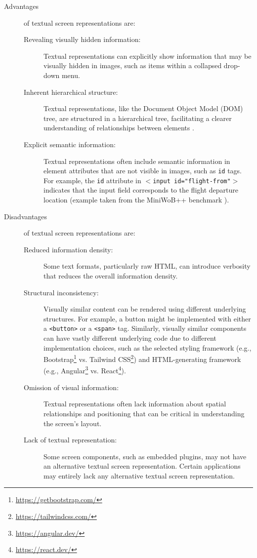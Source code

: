 %
\begin{description}
    \item[Advantages] of textual screen representations are: \hfill
    \begin{description}
        \item[Revealing visually hidden information:] 
            Textual representations can explicitly show information that may be visually hidden in images, such as items within a collapsed drop-down menu.
        \item[Inherent hierarchical structure:] 
            Textual representations, like the Document Object Model (DOM) tree, are structured in a hierarchical tree, facilitating a clearer understanding of relationships between elements .
        \item[Explicit semantic information:] 
            Textual representations often include semantic information in element attributes that are not visible in images, such as \texttt{id} tags. For example, the \texttt{id} attribute in \texttt{\(<\)input id="flight-from"\(>\)} indicates that the input field corresponds to the flight departure location (example taken from the MiniWoB++ benchmark \citep{shi_world_2017}).
    \end{description}
    \item[Disadvantages] of textual screen representations are: \hfill
    \begin{description}
        \item[Reduced information density:] 
            Some text formats, particularly raw HTML, can introduce verbosity that reduces the overall information density.
        \item[Structural inconsistency:] 
            Visually similar content can be rendered using different underlying structures. For example, a button might be implemented with either a \texttt{<button>} or a \texttt{<span>} tag. Similarly, visually similar components can have vastly different underlying code due to different implementation choices, such as the selected styling framework (e.g., Bootstrap\footnote{\url{https://getbootstrap.com/}} vs. Tailwind CSS\footnote{\url{https://tailwindcss.com/}}) and HTML-generating framework (e.g., Angular\footnote{\url{https://angular.dev/}} vs. React\footnote{\url{https://react.dev/}}).
        \item[Omission of visual information:] 
            Textual representations often lack information about spatial relationships and positioning that can be critical in understanding the screen's layout.
        \item[Lack of textual representation:] 
            Some screen components, such as embedded plugins, may not have an alternative textual screen representation. Certain applications may entirely lack any alternative textual screen representation.
    \end{description}
\end{description}

